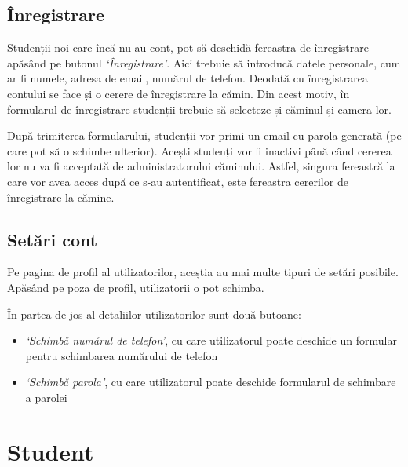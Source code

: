\documentclass[12pt,a4paper]{report}
\theoremstyle{definition}
\theoremstyle{remark}
\begin{document}
\subsection{Înregistrare}

\par Studenții noi care încă nu au cont, pot să deschidă fereastra de înregistrare apăsând pe butonul \textit{`Înregistrare'}. Aici trebuie să introducă datele personale, cum ar fi numele, adresa de email, numărul de telefon. Deodată cu înregistrarea contului se face și o cerere de înregistrare la cămin. Din acest motiv, în formularul de înregistrare studenții trebuie să selecteze și căminul și camera lor.


\par După trimiterea formularului, studenții vor primi un email cu parola generată (pe care pot să o schimbe ulterior). Acești studenți vor fi inactivi până când cererea lor nu va fi acceptată de administratorului căminului. Astfel, singura fereastră la care vor avea acces după ce s-au autentificat, este fereastra cererilor de înregistrare la cămine.

\subsection{Setări cont}

\par Pe pagina de profil al utilizatorilor, aceștia au mai multe tipuri de setări posibile. Apăsând pe poza de profil, utilizatorii o pot schimba.


\par În partea de jos al detaliilor utilizatorilor sunt două butoane:
\begin{itemize}
    \item \textit{`Schimbă numărul de telefon'}, cu care utilizatorul poate deschide un formular pentru schimbarea numărului de telefon
    \item \textit{`Schimbă parola'}, cu care utilizatorul poate deschide formularul de schimbare a parolei
\end{itemize}


\section{Student}
\end{document}
